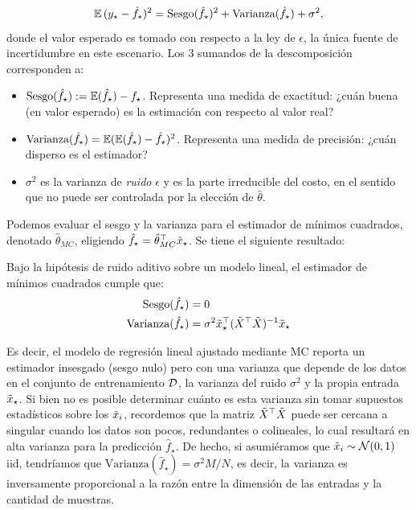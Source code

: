 \begin{equation}
 	\operatorname{\mathbb{E}}{(y_\star - \hat f_\star)^2} = \text{Sesgo}(\hat f_\star)^2 + \text{Varianza}(\hat f_\star) + \sigma^2,\label{eq:expected_sq_loss}
 \end{equation} 
donde el valor esperado es tomado con respecto a la ley de $\epsilon$, la única fuente de incertidumbre en este escenario. Los 3 sumandos de la descomposición corresponden a:
 \begin{itemize}
 	\item $\text{Sesgo}(\hat f_\star) := \operatorname{\mathbb{E}}(\hat f_\star) - f_\star$. Representa una medida de exactitud: ¿cuán buena (en valor esperado) es la estimación con respecto al valor real?
 	\item $\text{Varianza}(\hat f_\star) = \operatorname{\mathbb{E}}(\operatorname{\mathbb{E}}(\hat f_\star)- \hat f_\star)^2$. Representa una medida de precisión: ¿cuán disperso es el estimador?
 	\item $\sigma^2$ es la varianza de \emph{ruido} $\epsilon$ y es la parte irreducible del costo, en el sentido que no puede ser controlada por la elección de $\hat\theta$.
 \end{itemize}

Podemos evaluar el sesgo y la varianza para el estimador de mínimos cuadrados, denotado $\hat\theta_{MC}$, eligiendo $\hat f_\star = \hat\theta_{MC}^\top\tilde{x}_\star$. Se tiene el siguiente resultado:

\begin{theorem} Bajo la hipótesis de ruido aditivo sobre un modelo lineal, el estimador de mínimos cuadrados cumple que:
	\begin{align}
	\text{Sesgo}(\hat f_\star) &= 0\\
	\text{Varianza}(\hat f_\star) &= \sigma^2 \tilde{x}_\star^\top (\tilde{X}^\top\tilde{X})^{-1}	\tilde{x}_\star
\end{align}
\end{theorem}

Es decir, el modelo de regresión lineal ajustado mediante MC reporta un estimador insesgado (sesgo nulo) pero con una varianza que depende de los datos en el conjunto de entrenamiento ${\mathcal D}$, la varianza del ruido $\sigma^2$ y la propia entrada $\tilde{x}_\star$. Si bien no es posible determinar cuánto es esta varianza sin tomar supuestos estadísticos sobre los $\tilde{x}_i$, recordemos que la matriz $\tilde{X}^\top\tilde{X}$ puede ser cercana a singular cuando los datos son pocos, redundantes o colineales, lo cual resultará en alta varianza para la predicción $\hat f_\star$. De hecho, si asumiéramos que $\tilde{x}_i\sim{\mathcal N}(0,1)$ iid, tendríamos que $\text{Varianza}(\hat f_\star) = \sigma^2 M/N$, es decir, la varianza es inversamente proporcional a la razón entre la dimensión de las entradas y la cantidad de muestras.\\

